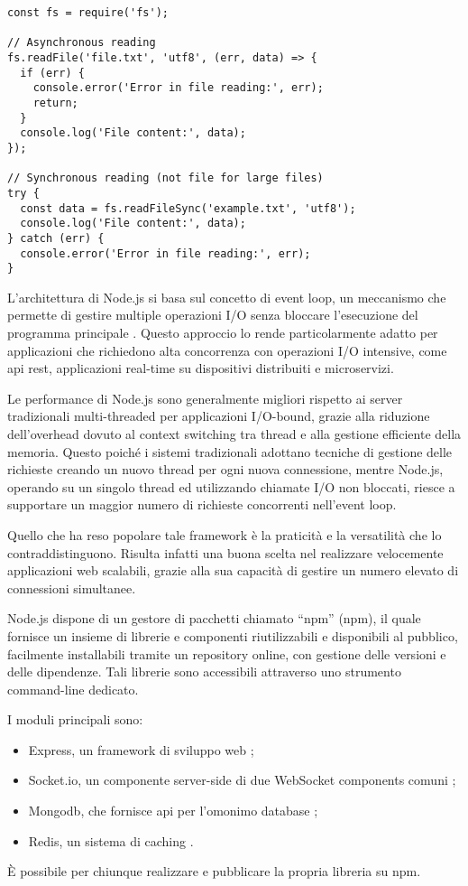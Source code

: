 \begin{lstlisting}[caption={Lettura asincrona di file}, label=lst:node-fs]
const fs = require('fs');

// Asynchronous reading
fs.readFile('file.txt', 'utf8', (err, data) => {
  if (err) {
    console.error('Error in file reading:', err);
    return;
  }
  console.log('File content:', data);
});

// Synchronous reading (not file for large files)
try {
  const data = fs.readFileSync('example.txt', 'utf8');
  console.log('File content:', data);
} catch (err) {
  console.error('Error in file reading:', err);
}
\end{lstlisting}

L'architettura di Node.js si basa sul concetto di event loop, un meccanismo che permette di gestire multiple operazioni
I/O senza bloccare l'esecuzione del programma principale \citep{nodejs_docs_2023}. Questo approccio lo rende
particolarmente adatto per applicazioni che richiedono alta concorrenza con operazioni I/O intensive,
come \acrshort{api} \acrshort{rest}, applicazioni real-time su dispositivi distribuiti e microservizi.

Le performance di Node.js sono generalmente migliori rispetto ai server tradizionali multi-threaded per applicazioni
I/O-bound, grazie alla riduzione dell'overhead dovuto al context switching tra thread e alla gestione efficiente della
memoria. Questo poiché i sistemi tradizionali adottano tecniche di gestione delle richieste creando un nuovo thread
per ogni nuova connessione, mentre Node.js, operando su un singolo thread ed utilizzando chiamate I/O non bloccati,
riesce a supportare un maggior numero di richieste concorrenti nell'event loop.

Quello che ha reso popolare tale framework è la praticità e la versatilità che lo contraddistinguono.
Risulta infatti una buona scelta nel realizzare velocemente applicazioni web scalabili, grazie alla sua capacità
di gestire un numero elevato di connessioni simultanee.

Node.js dispone di un gestore di pacchetti chiamato ``\acrshort{npm}'' (\acrlong{npm}), il quale fornisce un insieme
di librerie e componenti riutilizzabili e disponibili al pubblico, facilmente installabili tramite un repository online,
con gestione delle versioni e delle dipendenze. Tali librerie sono accessibili attraverso uno strumento
command-line dedicato.

I moduli principali sono:
\begin{itemize}
  \item Express, un framework di sviluppo web \cite{express_js};
  \item Socket.io, un componente server-side di due WebSocket components comuni \cite{socket_io};
  \item Mongodb, che fornisce \acrshort{api} per l'omonimo database \cite{mongodb};
  \item Redis, un sistema di caching \cite{redis}.
\end{itemize}
È possibile per chiunque realizzare e pubblicare la propria libreria su \acrfull{npm}.

